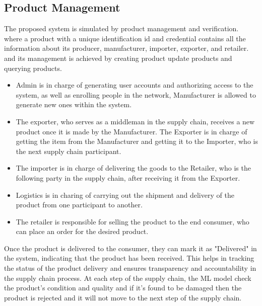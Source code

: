 \subsection{Product Management}
\indent The proposed system is simulated by product management and verification. where a product with a unique identification id and credential contains all the information about its producer, manufacturer, importer, exporter, and retailer.
and its management is achieved by creating product update products and querying products.
\begin{itemize} 
\item	Admin is in charge of generating user accounts and authorizing access to the system, as well as enrolling people in the network, Manufacturer is allowed to generate new ones within the system.
\item	The exporter, who serves as a middleman in the supply chain, receives a new product once it is made by the Manufacturer. The Exporter is in charge of getting the item from the Manufacturer and getting it to the Importer, who is the next supply chain participant.
\item	 The importer is in charge of delivering the goods to the Retailer, who is the following party in the supply chain, after receiving it from the Exporter. 
\item	Logistics is in charing of carrying out the shipment and delivery of the product from one participant to another.
\item	The retailer is responsible for selling the product to the end consumer, who can place an order for the desired product.
\end{itemize}
\indent Once the product is delivered to the consumer, they can mark it as "Delivered" in the system, indicating that the product has been received. This helps in tracking the status of the product delivery and ensures transparency and accountability in the supply chain process.
At each step of the supply chain, the ML model check the product's condition and quality and if it's found to be damaged then the product is rejected and it will not move to the next step of the supply chain.
